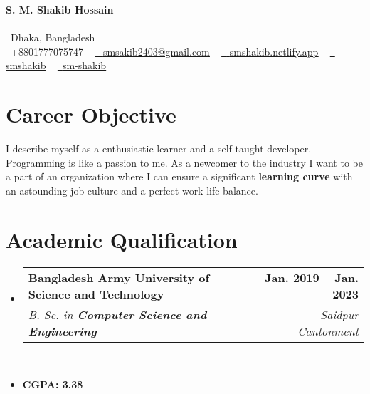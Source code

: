 \documentclass[letterpaper,11pt]{article}
\makeatletter
\newcommand{\resumeItem}[1]{
  \item\small{
    {#1 \vspace{-2pt}}
  }
}
\newcommand{\resumeSubheading}[4]{
  \vspace{-2pt}\item
    \begin{tabular*}{1.0\textwidth}[t]{l@{\extracolsep{\fill}}r}
      \textbf{#1} & \textbf{\small #2} \\
      \textit{\small#3} & \textit{\small #4} \\
    \end{tabular*}\vspace{-7pt}
}
\newcommand{\resumeSubHeadingListStart}{\begin{itemize}[leftmargin=0.0in, label={}]}
\newcommand{\resumeSubHeadingListEnd}{\end{itemize}}
\makeatother
\begin{document}

\begin{center}
    {\Huge \textbf{S. M. Shakib Hossain}} \\ \vspace{1pt}
   \\\faMapMarker\ Dhaka, Bangladesh \\ \vspace{1pt}
    \small \raisebox{-0.1\height}\faPhone\ +8801777075747 ~ \href{mailto:smsakib2403@gmail.com}{\raisebox{-0.2\height}\faEnvelope\  { \underline{smsakib2403@gmail.com}}} ~ 
    \href{https://smshakib.netlify.app}{\raisebox{-0.2\height}\faHome\   { \underline{smshakib.netlify.app}}} ~
    \href{https://www.linkedin.com/in/smshakib/}{\raisebox{-0.2\height}\faLinkedin\ { \underline{smshakib}}} ~
    \href{https://github.com/sm-shakib}{\raisebox{-0.2\height}\faGithub\   \underline{sm-shakib}}
    \vspace{2pt}
\end{center}


\section{Career Objective}
\resumeSubHeadingListStart
      {I describe myself as a enthusiastic learner and a self taught developer. Programming is like a passion to me. As a newcomer to the industry I want to be a part of an organization where I can ensure a significant \textbf{learning curve} with an astounding job culture and a perfect work-life balance.}
\resumeSubHeadingListEnd 
 \vspace{-16pt}

\section{Academic Qualification}
  \resumeSubHeadingListStart
    \resumeSubheading
      {Bangladesh Army University of Science and Technology}{Jan. 2019 -- Jan. 2023}
      {B. Sc. in \textbf{Computer Science and Engineering}}{\faMapMarker\ Saidpur Cantonment} \\
        \resumeItem{\textbf{CGPA:  3.38}}
  \resumeSubHeadingListEnd
\end{document}
